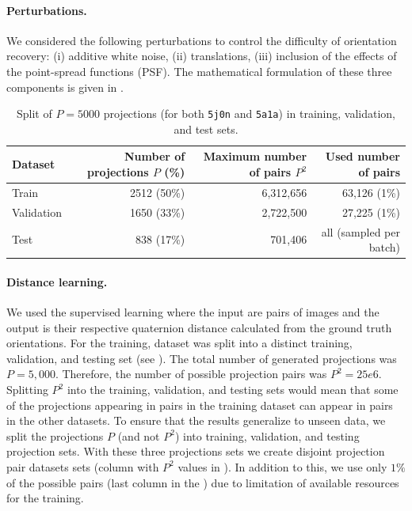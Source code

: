 \paragraph{Perturbations.}
We considered the following perturbations to control the difficulty of orientation recovery: (i) additive white noise, (ii) translations, (iii) inclusion of the effects of the point-spread functions (PSF). 
The mathematical formulation of these three components is given in .

\begin{table}[ht!]
    \centering
    \begin{tabular}{lrrr}
        \toprule
        Dataset & Number of projections $P$ (\%) & Maximum number of pairs $P^2$ & Used number of pairs \\
        \midrule
        Train & 2512 (50\%) & 6,312,656 & 63,126 (1\%) \\
        Validation & 1650 (33\%) & 2,722,500 & 27,225 (1\%) \\
        Test & 838 (17\%) & 701,406 & all (sampled per batch) \\
        \bottomrule
    \end{tabular}
    \caption{
        Split of $P=5000$ projections (for both \texttt{5j0n} and \texttt{5a1a}) in training, validation, and test sets.
    }\label{tab:dataset}
\end{table}

\paragraph{Distance learning.}
We used the supervised learning where the input are pairs of images and the output is their respective quaternion distance calculated from the ground truth orientations.
For the training, dataset was split into a distinct training, validation, and testing set (see ).
The total number of generated projections was $P = 5,000$.
Therefore, the number of possible projection pairs was $P^2 = 25e6$.
Splitting $P^2$ into the training, validation, and testing sets would mean that some of the projections appearing in pairs in the training dataset can appear in pairs in the other datasets.
To ensure that the results generalize to unseen data, we split the projections $P$ (and not $P^2$) into training, validation, and testing projection sets.
With these three projections sets we create disjoint projection pair datasets sets (column with $P^2$ values in ).
In addition to this, we use only $1\%$ of the possible pairs (last column in the ) due to limitation of available resources for the training.


